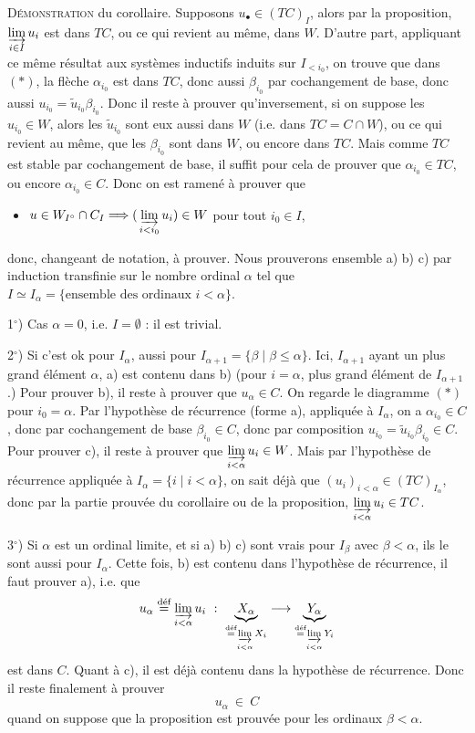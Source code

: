 \documentclass[11pt]{article}
\newcommand{\msp}[1]{\ifstrequal{#1}{page 1}{}{\marginpar{\footnotesize [#1]}}}
\begin{document}

\textsc{Démonstration} du corollaire. Supposons $u_\bullet \in (TC)_I$, alors par la proposition, $\varinjlim\limits_{i\in I} u_i$ est dans $TC$, ou ce qui revient au même, dans $W$. D'autre part, appliquant ce même résultat aux systèmes inductifs induits sur $I_{<i_0}$, on trouve que dans $(*)$, la flèche $\alpha_{i_0}$ est dans $TC$, donc aussi $\beta_{i_0}$ par cochangement de base, donc aussi $u_{i_0} = \tilde{u}_{i_0}\beta_{i_0}$. Donc il reste à prouver qu'inversement, si on suppose les $u_{i_0} \in W$, alors les $\tilde{u}_{i_0}$ sont eux aussi dans $W$ (i.e. dans $TC = C \cap W$), ou ce qui revient au même, que les $\beta_{i_0}$ sont dans $W$, ou encore dans $TC$. Mais comme $TC$ est stable par cochangement de base, il suffit pour cela de prouver que $\alpha_{i_0} \in TC$, ou encore $\alpha_{i_0} \in C$. Donc on est ramené à prouver que
\begin{itemize}[leftmargin=2.5em]
\item[c)] $u \in W_{I^{\circ}} \cap C_I \Longrightarrow (\,\varinjlim\limits_{i<i_0} u_i) \in W$ pour tout $i_0 \in I$,
\end{itemize}
donc, changeant de notation, à prouver. Nous prouverons ensemble a) b) c) par induction transfinie sur le nombre ordinal $\alpha$ tel que $I \simeq I_\alpha = \{\text{ensemble des ordinaux } i < \alpha\}$.

\msp{page 4}

1$^\circ$) Cas $\alpha = 0$, i.e. $I = \emptyset$ : il est trivial.

2$^\circ$) Si c'est ok pour $I_\alpha$, aussi pour $I_{\alpha+1} = \{\beta \mid \beta \leq \alpha\}$. Ici, $I_{\alpha+1}$ ayant un plus grand élément $\alpha$, a) est contenu dans b) (pour $i = \alpha$, plus grand élément de $I_{\alpha+1}$.) Pour prouver b), il reste à prouver que $u_\alpha \in C$. On regarde le diagramme $(*)$ pour $i_0 = \alpha$. Par l'hypothèse de récurrence (forme a), appliquée à $I_\alpha$, on a $\alpha_{i_0} \in C$, donc par cochangement de base $\beta_{i_0} \in C$, donc par composition $u_{i_0} = \tilde{u}_{i_0}\beta_{i_0} \in C$. Pour prouver c), il reste à prouver que $\varinjlim\limits_{i<\alpha} u_i \in W$. Mais par l'hypothèse de récurrence appliquée à $I_\alpha = \{i \mid i < \alpha\}$, on sait déjà que $(u_i)_{i<\alpha} \in (TC)_{I_\alpha}$, donc par la partie prouvée du corollaire ou de la proposition, $\varinjlim\limits_{i<\alpha} u_i \in TC$.

3$^\circ$) Si $\alpha$ est un ordinal limite, et si a) b) c) sont vrais pour $I_\beta$ avec $\beta < \alpha$, ils le sont aussi pour $I_\alpha$. Cette fois, b) est contenu dans l'hypothèse de
\msp{page 5}
récurrence, il faut prouver a), i.e. que
\[
u_\alpha \overset{\text{déf}}{=} \varinjlim_{i<\alpha} u_i \ :\ \underbrace{X_\alpha}_{\overset{\text{déf}}{=} \varinjlim\limits_{i<\alpha} X_i} \longrightarrow \underbrace{Y_\alpha}_{\overset{\text{déf}}{=} \varinjlim\limits_{i<\alpha} Y_i}
\]
est dans $C$. Quant à c), il est déjà contenu dans la hypothèse de récurrence. Donc il reste finalement à prouver
\[
u_\alpha \ \in \ C
\]
quand on suppose que la proposition est prouvée pour les ordinaux $\beta < \alpha$.
\end{document}
